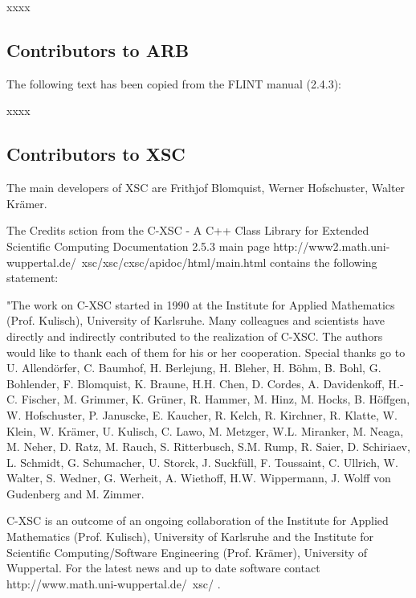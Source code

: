 \vpara
xxxx


\subsection{Contributors to ARB}
\label{Contributors to ARB}
The following text has been copied from the FLINT manual (2.4.3):

\vpara
xxxx

%
%
%
%



\subsection{Contributors to XSC}
\label{Contributors to XSC}
The main developers of XSC are Frithjof Blomquist, Werner Hofschuster, Walter Kr\"amer.

\vpara
The Credits sction from the C-XSC - A C++ Class Library for Extended Scientific Computing Documentation 2.5.3 main page http://www2.math.uni-wuppertal.de/~xsc/xsc/cxsc/apidoc/html/main.html contains the following statement:

\vpara
"The work on C-XSC started in 1990 at the Institute for Applied Mathematics (Prof. Kulisch), University of Karlsruhe. Many colleagues and scientists have directly and indirectly contributed to the realization of C-XSC. The authors would like to thank each of them for his or her cooperation. Special thanks go to U. Allendörfer, C. Baumhof, H. Berlejung, H. Bleher, H. Böhm, B. Bohl, G. Bohlender, F. Blomquist, K. Braune, H.H. Chen, D. Cordes, A. Davidenkoff, H.-C. Fischer, M. Grimmer, K. Grüner, R. Hammer, M. Hinz, M. Hocks, B. Höffgen, W. Hofschuster, P. Januscke, E. Kaucher, R. Kelch, R. Kirchner, R. Klatte, W. Klein, W. Krämer, U. Kulisch, C. Lawo, M. Metzger, W.L. Miranker, M. Neaga, M. Neher, D. Ratz, M. Rauch, S. Ritterbusch, S.M. Rump, R. Saier, D. Schiriaev, L. Schmidt, G. Schumacher, U. Storck, J. Suckfüll, F. Toussaint, C. Ullrich, W. Walter, S. Wedner, G. Werheit, A. Wiethoff, H.W. Wippermann, J. Wolff von Gudenberg and M. Zimmer.

\vpara
C-XSC is an outcome of an ongoing collaboration of the Institute for Applied Mathematics (Prof. Kulisch), University of Karlsruhe and the Institute for Scientific Computing/Software Engineering (Prof. Krämer), University of Wuppertal. For the latest news and up to date software contact http://www.math.uni-wuppertal.de/~xsc/ .

